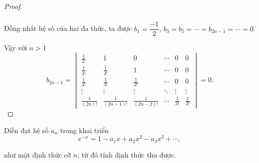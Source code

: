 \documentclass[class=nhvh-linear-algebra,crop=false]{standalone}
\begin{document}
\begin{proof}
\begin{align*}
    \end{align*}
    \par Đồng nhất hệ số của hai đa thức, ta được $b_{1} = \dfrac{-1}{2}$, $b_{3} = b_{5} = \cdots = b_{2n-1} = \cdots = 0$.
    \par Vậy với $n > 1$
    \[
        b_{2n-1} =
        \begin{vmatrix}
            \frac{1}{2!}    & 1                 & 0                 & \cdots & 0            & 0            \\
            \frac{1}{3!}    & \frac{1}{2!}      & 1                 & \cdots & 0            & 0            \\
            \frac{1}{4!}    & \frac{1}{3!}      & \frac{1}{2!}      & \cdots & 0            & 0            \\
            \vdots          & \vdots            & \vdots            & \ddots & \vdots       & \vdots       \\
            \frac{1}{(2n)!} & \frac{1}{(2n-1)!} & \frac{1}{(2n-2)!} & \cdots & \frac{1}{3!} & \frac{1}{2!}
        \end{vmatrix}
        = 0.
    \]
\end{proof}

\begin{exercise}
    \par Diễn đạt hệ số $a_{n}$ trong khai triển
    \[
        e^{-x} = 1 - a_{1}x + a_{2}x^{2} - a_{3}x^{3} + \cdots ,
    \]
    \par như một định thức cỡ $n$, từ đó tính định thức thu được.
\end{exercise}
\end{document}
